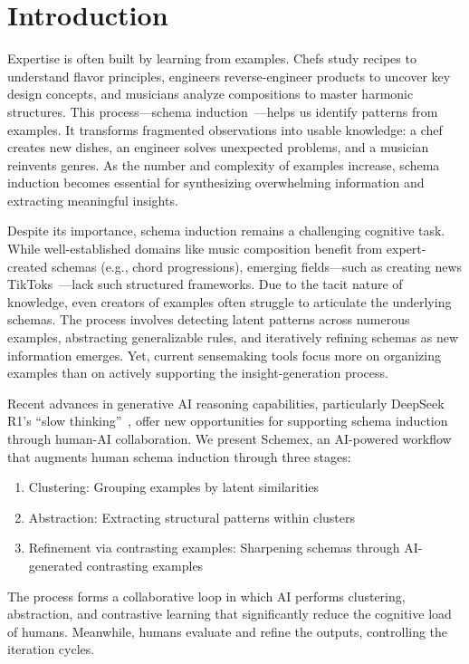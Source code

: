 \section{Introduction}

Expertise is often built by learning from examples.
Chefs study recipes to understand flavor principles, engineers reverse-engineer products to uncover key design concepts, and musicians analyze compositions to master harmonic structures.
This process—schema induction~\cite{gick1983schema}—helps us identify patterns from examples. 
It transforms fragmented observations into usable knowledge: a chef creates new dishes, an engineer solves unexpected problems, and a musician reinvents genres.
As the number and complexity of examples increase, schema induction becomes essential for synthesizing overwhelming information and extracting meaningful insights.

Despite its importance, schema induction remains a challenging cognitive task.
While well-established domains like music composition benefit from expert-created schemas (e.g., chord progressions), emerging fields—such as creating news TikToks~\cite{reelframer}—lack such structured frameworks.
Due to the tacit nature of knowledge, even creators of examples often struggle to articulate the underlying schemas.
The process involves detecting latent patterns across numerous examples, abstracting generalizable rules, and iteratively refining schemas as new information emerges.
Yet, current sensemaking tools focus more on organizing examples than on actively supporting the insight-generation process.

Recent advances in generative AI reasoning capabilities, particularly DeepSeek R1's ``slow thinking''~\cite{guo2025deepseek}, offer new opportunities for supporting schema induction through human-AI collaboration.
We present Schemex, an AI-powered workflow that augments human schema induction through three stages:
\begin{enumerate}[noitemsep]
\item Clustering: Grouping examples by latent similarities
\item Abstraction: Extracting structural patterns within clusters
\item Refinement via contrasting examples: Sharpening schemas through AI-generated contrasting examples
\end{enumerate}
The process forms a collaborative loop in which AI performs clustering, abstraction, and contrastive learning that significantly reduce the cognitive load of humans.
Meanwhile, humans evaluate and refine the outputs, controlling the iteration cycles.

